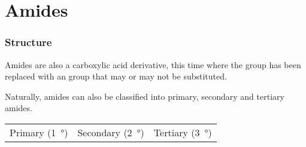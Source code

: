 


\pagebreak
\hypertarget{ChapterAmides}{}
\part{Amides}

	\section{Structure}

		Amides are also a carboxylic acid derivative, this time where the  group has been replaced with an  group that
		may or may not be substituted.

		Naturally, amides can also be classified into primary, secondary and tertiary amides.

		\begin{center}\begin{table}[ht]\renewcommand{\arraystretch}{1.4}
		\begin{tabu} to \textwidth {| X[c,m] | X[c,m] | X[c,m] |}

			\hline
			\vspace{2mm}			\vspace{2mm}	&
			\vspace{2mm}		\vspace{2mm}	&
			\vspace{2mm}	\vspace{2mm}	\\

			\hline
			\vspace{2mm}Primary (\SI{1}{\degree})		\vspace{2mm} &
			\vspace{2mm}Secondary (\SI{2}{\degree})		\vspace{2mm} &
			\vspace{2mm}Tertiary (\SI{3}{\degree})		\vspace{2mm} \\
			\hline

		\end{tabu}
		\end{table}\end{center}\vspace{-10mm}


